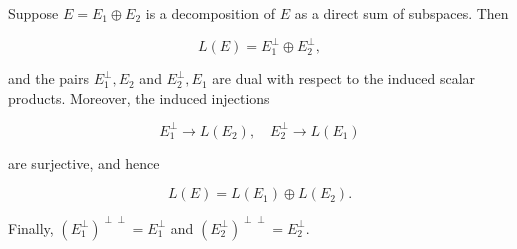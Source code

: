 Suppose $E = E_1 \oplus E_2$ is a decomposition of $E$ as a direct sum of subspaces. Then

$$L(E) = E_1^\perp \oplus E_2^\perp,$$

and the pairs $E_1^\perp, E_2$ and $E_2^\perp, E_1$ are dual with respect to the induced scalar products. Moreover, the induced injections

$$E_1^\perp \rightarrow L(E_2), \quad E_2^\perp \rightarrow L(E_1)$$

are surjective, and hence

$$L(E) = L(E_1) \oplus L(E_2).$$

Finally, $(E_1^\perp)^{\perp\perp} = E_1^\perp$ and $(E_2^\perp)^{\perp\perp} = E_2^\perp$.

